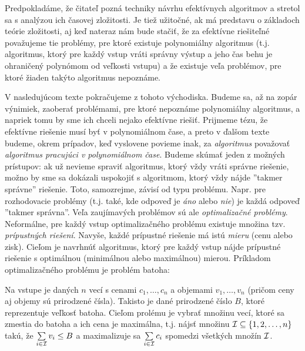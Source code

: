 Predpokladáme, že čitateľ pozná techniky návrhu efektívnych algoritmov a
stretol sa s analýzou ich časovej zložitosti. Je tiež užitočné, ak má predstavu
o základoch teórie zložitosti, aj keď nateraz nám bude stačiť, že za efektívne
riešiteľné považujeme tie problémy, pre ktoré existuje polynomiálny algoritmus
(t.j. algoritmus, ktorý pre každý vstup vráti správny výstup a jeho čas behu je
ohraničený polynómom od veľkosti vstupu) a že existuje veľa problémov, pre
ktoré žiaden takýto algoritmus nepoznáme. 

V nasledujúcom texte pokračujeme z tohoto východiska. Budeme sa, až na zopár
výnimiek, zaoberať problémami, pre ktoré nepoznáme polynomiálny algoritmus, a
napriek tomu by sme ich chceli nejako efektívne riešiť. Prijmeme tézu, že 
efektívne riešenie musí byť v polynomiálnom čase, a preto v ďalšom texte budeme,
okrem prípadov, keď vyslovene povieme inak, za {\em algoritmus} považovať
{\em algoritmus pracujúci v polynomiálnom čase}.
Budeme skúmať jeden z možných
prístupov: ak už nevieme spraviť algoritmus, ktorý vždy vráti
správne riešenie, možno by sme sa dokázali uspokojiť s 
algoritmom, ktorý vždy nájde ''takmer správne'' riešenie. Toto,
samozrejme, závisí od typu problému.  Napr. pre rozhodovacie problémy (t.j.
také, kde odpoveď je {\em áno} alebo {\em nie}) je každá odpoveď ''takmer
správna''. Veľa zaujímavých problémov sú ale {\em optimalizačné problémy}.
Neformálne, pre každý vstup optimalizačného problému existuje množina tzv. {\em
prípustných riešení}. Navyše, každé prípustné riešenie má istú {\em mieru}
(cenu alebo zisk). Cieľom je navrhnúť algoritmus, ktorý pre každý vstup nájde
prípustné riešenie s optimálnou (minimálnou alebo maximálnou) mierou.
Príkladom optimalizačného problému je problém batoha:

\shorthandoff{-}  
  \begin{framed}
  \begin{dfn}
    \label{dfn:knapsack}
    Na vstupe je daných $n$ vecí s cenami $c_1,\ldots,c_n$ a objemami
    $v_1,\ldots,v_n$ (pričom ceny aj objemy sú prirodzené čísla).  Takisto
    je dané prirodzené číslo $B$, ktoré reprezentuje veľkosť batoha. Cieľom
    prolému \knapsack je vybrať množinu vecí, ktoré sa zmestia do batoha a ich
    cena je maximálna, t.j. nájsť množinu ${\cal I}\subseteq\{1,2,\ldots,n\}$
    takú, že $\sum\limits_{i\in{\cal I}}v_i\le B$  a maximalizuje sa
    $\sum\limits_{i\in{\cal I}}c_i$ spomedzi všetkých množín $\cal I$.
  \end{dfn}
\end{framed}


